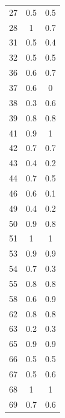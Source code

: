 \documentclass[11pt]{article} %
\begin{document}
\begin{table}[h]
\begin{center}
\begin{tabular}{c|c|c|}
            27  & 0.5               & 0.5               \\
            28  & 1                 & 0.7               \\
            31  & 0.5               & 0.4               \\
            32  & 0.5               & 0.5               \\
            36  & 0.6               & 0.7               \\
            37  & 0.6               & 0                 \\
            38  & 0.3               & 0.6               \\
            39  & 0.8               & 0.8               \\
            41  & 0.9               & 1                 \\
            42  & 0.7               & 0.7               \\
            43  & 0.4               & 0.2               \\
            44  & 0.7               & 0.5               \\
            46  & 0.6               & 0.1               \\
            49  & 0.4               & 0.2               \\
            50  & 0.9               & 0.8               \\
            51  & 1                 & 1                 \\
            53  & 0.9               & 0.9               \\
            54  & 0.7               & 0.3               \\
            55  & 0.8               & 0.8               \\
            58  & 0.6               & 0.9               \\
            62  & 0.8               & 0.8               \\
            63  & 0.2               & 0.3               \\
            65  & 0.9               & 0.9               \\
            66  & 0.5               & 0.5               \\
            67  & 0.5               & 0.6               \\
            68  & 1                 & 1                 \\
            69  & 0.7               & 0.6               \\

\end{tabular}
\end{center}
\end{table}
\end{document}
